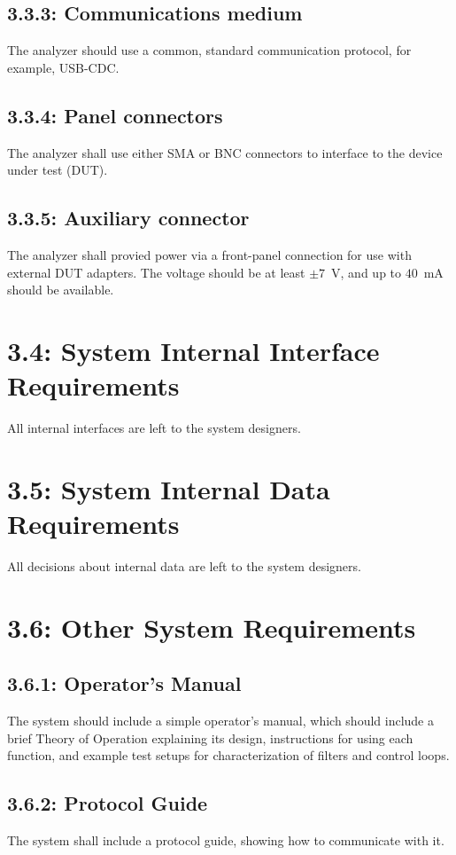 \subsection*{3.3.3: Communications medium}
\label{prs:3.3.3}
The analyzer should use a common, standard communication protocol, for example, USB-CDC.

\subsection*{3.3.4: Panel connectors}
\label{prs:3.3.4}
The analyzer shall use either SMA or BNC connectors to interface to the device under test (DUT).

\subsection*{3.3.5: Auxiliary connector}
\label{prs:3.3.5}
The analyzer shall provied power via a front-panel connection for use with external DUT
adapters. The voltage should be at least $\pm 7$~V, and up to $40$~mA should be available.

\section*{3.4: System Internal Interface Requirements}
All internal interfaces are left to the system designers.

\section*{3.5: System Internal Data Requirements}
All decisions about internal data are left to the system designers.

\section*{3.6: Other System Requirements}

\subsection*{3.6.1: Operator's Manual}
\label{prs:3.6.1}
The system should include a simple operator's manual, which should include a brief
Theory of Operation explaining its design, instructions for using each function,
and example test setups for characterization of filters and control loops.

\subsection*{3.6.2: Protocol Guide}
\label{prs:3.6.2}
The system shall include a protocol guide, showing how to communicate with it.

